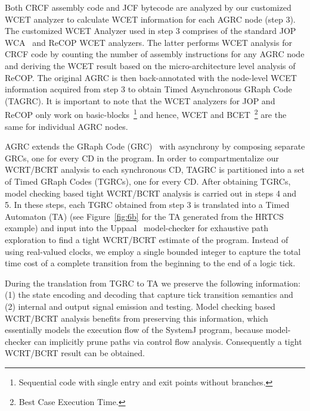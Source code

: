 Both CRCF assembly code and JCF bytecode are analyzed by our customized
WCET analyzer to calculate WCET information for each AGRC node (step
3). The customized WCET Analyzer used in step 3 comprises of the
standard JOP WCA~\cite{jop:jnl:jsa2007} and ReCOP WCET analyzers. The
latter performs WCET analysis for CRCF code by counting the number of
assembly instructions for any AGRC node and deriving the WCET result
based on the micro-architecture level analysis of ReCOP. The original
AGRC is then back-annotated with the node-level WCET information
acquired from step 3 to obtain Timed Asynchronous GRaph Code (TAGRC). It
is important to note that the WCET analyzers for JOP and ReCOP only work
on basic-blocks~\footnote{Sequential code with single entry and exit
  points without branches.} and hence, WCET and BCET~\footnote{Best Case
  Execution Time.} are the same for individual AGRC nodes.

AGRC extends the GRaph Code (GRC)~\cite{pbat07} with asynchrony by
composing separate GRCs, one for every CD in the program. In order to
compartmentalize our WCRT/BCRT analysis to each synchronous CD, TAGRC is
partitioned into a set of Timed GRaph Codes (TGRCs), one for every
CD. After obtaining TGRCs, model checking based tight WCRT/BCRT analysis
is carried out in steps 4 and 5. In these steps, each TGRC obtained from
step 3 is translated into a Timed Automaton (TA) (see
Figure~\ref{fig:6b} for the TA generated from the HRTCS example) and
input into the Uppaal~\cite{gbeh04} model-checker for exhaustive path
exploration to find a tight WCRT/BCRT estimate of the program. Instead
of using real-valued clocks, we employ a single bounded integer to
capture the total time cost of a complete transition from the beginning
to the end of a logic tick.

During the translation from TGRC to TA we preserve the following
information: (1) the state encoding and decoding that capture tick
transition semantics and (2) internal and output signal emission and
testing. Model checking based WCRT/BCRT analysis benefits from
preserving this information, which essentially models the execution flow
of the SystemJ program, because model-checker can implicitly prune paths
via control flow analysis. Consequently a tight WCRT/BCRT result can be
obtained. %

